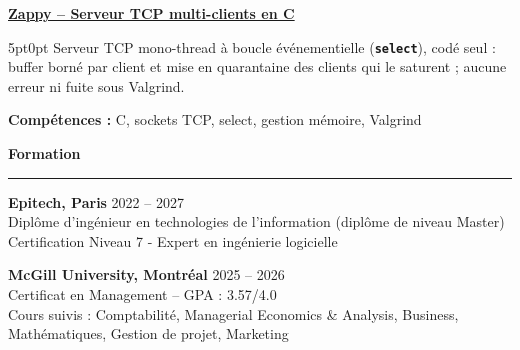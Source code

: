 \documentclass[9pt]{extarticle}
\begin{document}
\par\vspace{8pt}

\underline{\bfseries Zappy -- Serveur TCP multi-clients en C}
\par
\begin{adjustwidth}{5pt}{0pt}
    Serveur TCP mono-thread à boucle événementielle ({\bfseries \texttt{select}}), codé seul : buffer borné par client et mise en quarantaine des clients qui le saturent ; aucune erreur ni fuite sous Valgrind.
\end{adjustwidth}
\par
{\bfseries Compétences :} C, sockets TCP, select, gestion mémoire, Valgrind

\par\vspace{8pt}

{\large\bfseries Formation}
\par\vspace{-8pt}
\rule{\linewidth}{0.4pt}
\par\vspace{5pt}

{\bfseries Epitech, Paris} \hfill 2022 -- 2027 \\
Diplôme d'ingénieur en technologies de l'information (diplôme de niveau Master) \\
Certification Niveau 7 - Expert en ingénierie logicielle

\vspace{6pt}

{\bfseries McGill University, Montréal} \hfill 2025 -- 2026 \\
Certificat en Management -- GPA : 3.57/4.0 \\
Cours suivis : Comptabilité, Managerial Economics \& Analysis, Business, Mathématiques, Gestion de projet, Marketing
\end{document}
